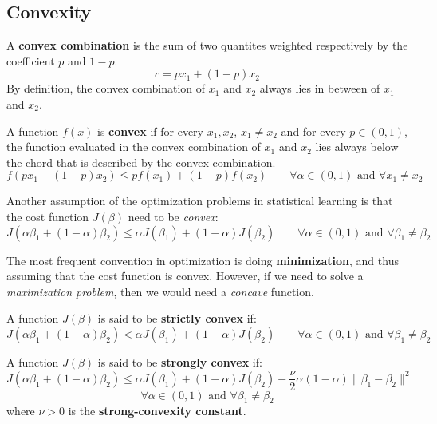 \subsection{Convexity}

\begin{definition}
    A \textbf{convex combination} is the sum of two quantites weighted respectively by the coefficient $p$ and $1-p$.
    \[
        c = p x_1 + (1-p) x_2
    \]
    By definition, the convex combination of $x_1$ and $x_2$ always lies in between of $x_1$ and $x_2$.
\end{definition}

\begin{definition}
    A function $f(x)$ is \textbf{convex} if for every $x_1, x_2$, $x_1 \neq x_2$ and for every $p \in (0,1)$, the function evaluated in the convex combination of $x_1$ and $x_2$ lies always below the chord that is described by the convex combination.
    \[
        f(p x_1 + (1-p) x_2) \leq p f(x_1) + (1-p) f(x_2) \qquad \forall \alpha \in (0,1) \text{ and } \forall x_1 \neq x_2
    \]
\end{definition}

Another assumption of the optimization problems in statistical learning is that the cost function $J(\beta)$ need to be \textit{convex}:
\[
    J(\alpha \beta_1 + (1-\alpha)\beta_2) \leq \alpha J(\beta_1) + (1-\alpha)J(\beta_2) \qquad  \forall \alpha \in (0,1) \text{ and } \forall \beta_1 \neq \beta_2
\]

The most frequent convention in optimization is doing \textbf{minimization}, and thus assuming that the cost function is convex. However, if we need to solve a \textit{maximization problem}, then we would need a \textit{concave} function.

\begin{definition}
    A function $J(\beta)$ is said to be \textbf{strictly convex} if:
    \[
        J(\alpha \beta_1 + (1-\alpha)\beta_2) < \alpha J(\beta_1) + (1-\alpha)J(\beta_2) \qquad \forall \alpha \in (0,1) \text{ and } \forall \beta_1 \neq \beta_2
    \]
\end{definition}

\begin{definition}
    A function $J(\beta)$ is said to  be \textbf{strongly convex} if:
    \[
        J(\alpha \beta_1 + (1-\alpha)\beta_2) \leq \alpha J(\beta_1) + (1-\alpha)J(\beta_2) - \frac{\nu}{2} \alpha (1-\alpha) \| \beta_1 - \beta_2 \|^2
    \]
    \[
        \forall \alpha \in (0,1) \text{ and } \forall \beta_1 \neq \beta_2
    \]
    where $\nu >0 $ is the \textbf{strong-convexity constant}.
\end{definition}

